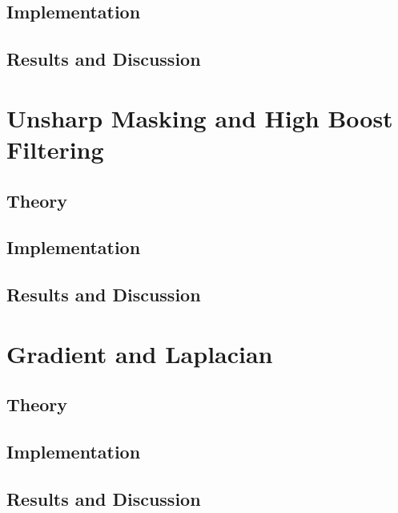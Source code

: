 \documentclass[headings=optiontoheadandtoc,listof=totoc,parskip=full]{scrartcl}
\begin{document}
\subsection{Implementation}
\label{sec:median-implementation}


\subsection{Results and Discussion}
\label{sec:median-results}


\section{Unsharp Masking and High Boost Filtering}
\label{sec:unsharp}


\subsection{Theory}


\subsection{Implementation}


\subsection{Results and Discussion}
\label{sec:unsharp-results}


\section{Gradient and Laplacian}
\label{sec:gradient}

\subsection{Theory}
\label{sec:gradient-theory}


\subsection{Implementation}
\label{sec:gradient-implementation}


\subsection{Results and Discussion}
\label{sec:gradient-results}
\end{document}
